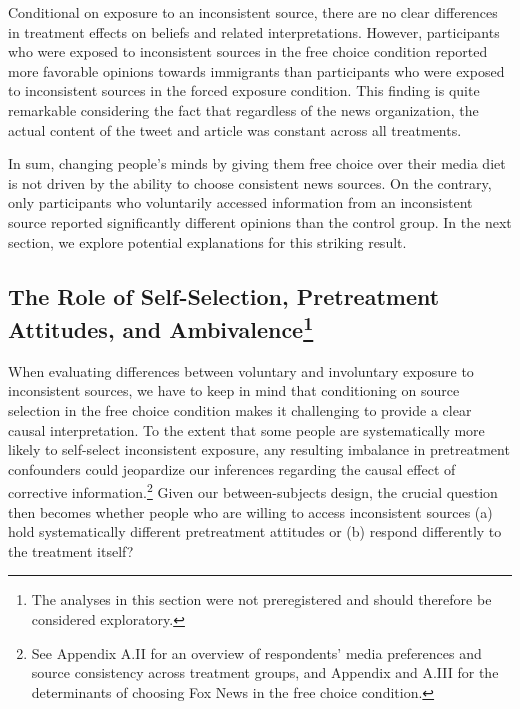 \documentclass[
  12pt,
]{article}
\begin{document}
Conditional on exposure to an inconsistent source, there are no clear
differences in treatment effects on beliefs and related interpretations.
However, participants who were exposed to inconsistent sources in the
free choice condition reported more favorable opinions towards
immigrants than participants who were exposed to inconsistent sources in
the forced exposure condition. This finding is quite remarkable
considering the fact that regardless of the news organization, the
actual content of the tweet and article was constant across all
treatments.

In sum, changing people's minds by giving them free choice over their
media diet is not driven by the ability to choose consistent news
sources. On the contrary, only participants who voluntarily accessed
information from an inconsistent source reported significantly different
opinions than the control group. In the next section, we explore
potential explanations for this striking result.

\hypertarget{the-role-of-self-selection-pretreatment-attitudes-and-ambivalence6}{%
\subsection[The Role of Self-Selection, Pretreatment Attitudes, and
Ambivalence]{\texorpdfstring{The Role of Self-Selection, Pretreatment
Attitudes, and
Ambivalence\footnote{The analyses in this section were not preregistered
  and should therefore be considered exploratory.}}{The Role of Self-Selection, Pretreatment Attitudes, and Ambivalence}}\label{the-role-of-self-selection-pretreatment-attitudes-and-ambivalence6}}

When evaluating differences between voluntary and involuntary exposure
to inconsistent sources, we have to keep in mind that conditioning on
source selection in the free choice condition makes it challenging to
provide a clear causal interpretation. To the extent that some people
are systematically more likely to self-select inconsistent exposure, any
resulting imbalance in pretreatment confounders could jeopardize our
inferences regarding the causal effect of corrective
information.\footnote{See Appendix A.II for an overview of respondents'
  media preferences and source consistency across treatment groups, and
  Appendix and A.III for the determinants of choosing Fox News in the
  free choice condition.} Given our between-subjects design, the crucial
question then becomes whether people who are willing to access
inconsistent sources (a) hold systematically different pretreatment
attitudes or (b) respond differently to the treatment itself?
\end{document}
